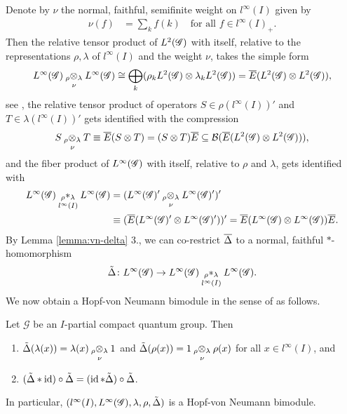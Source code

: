 Denote by $\nu$ the
normal, faithful, semifinite weight on $l^{\infty}(I)$ given by
\begin{align} \label{eq:vn-nu}
  \nu(f) &=\sum_{k} f(k) \quad \text{for all } f\in l^{\infty}(I)_{+}.
\end{align}
Then the relative tensor product of $L^{2}(\mathscr{G})$ with itself,
relative to the representations $\rho,\lambda$ of $l^{\infty}(I)$ and
the weight $\nu$, takes the simple form
\begin{align*}
L^{\infty}(\mathscr{G}) \underset{\nu{}}{_{\rho}\otimes_{\lambda}} L^{\infty}(\mathscr{G}) \cong
  \bigoplus_{k} (\rho_{k}L^{2}(\mathscr{G}) \otimes \lambda_{k}L^{2}(\mathscr{G})) =
  \overline{E}(L^{2}(\mathscr{G}) \otimes L^{2}(\mathscr{G})),
\end{align*}
see \cite{},  the relative tensor product
of operators $S\in \rho(l^{\infty}(I))'$ and $T \in
\lambda(l^{\infty}(I))'$ gets identified with the compression
\begin{align*}
S \underset{\nu{}}{_{\rho}\otimes_{\lambda}} T \equiv
  \overline{E}(S \otimes
  T) = (S \otimes T)\overline{E} \subseteq {\cal B}(\overline{E}(L^{2}(\mathscr{G})
  \otimes L^{2}(\mathscr{G}))),
\end{align*}
and the fiber product of  $  L^{\infty}(\mathscr{G})$ with itself, relative to $\rho$
and $\lambda$,  gets identified with
\begin{align} \label{eq:vn-fiber}
  \begin{aligned}
    L^{\infty}(\mathscr{G}) \underset{l^{\infty}(I)}{_{\rho}\ast_{\lambda}} L^{\infty}(\mathscr{G}) &= (L^{\infty}(\mathscr{G})' \underset{\nu{}}{_{\rho}\otimes_{\lambda}} L^{\infty}(\mathscr{G})')' \\ &\equiv
    (\overline{E}(L^{\infty}(\mathscr{G})' \otimes L^{\infty}(\mathscr{G})'))' = \overline{E}(L^{\infty}(\mathscr{G}) \otimes
    L^{\infty}(\mathscr{G}))\overline{E}.
  \end{aligned}
\end{align} 
By Lemma \ref{lemma:vn-delta} 3., we can co-restrict $\overline{\Delta}$ to  a
normal, faithful $*$-homomorphism
\begin{align*}
  \tilde\Delta \colon L^{\infty}(\mathscr{G}) \to   L^{\infty}(\mathscr{G}) \underset{l^{\infty}(I)}{_{\rho}\ast_{\lambda}} L^{\infty}(\mathscr{G}).
\end{align*}
We now obtain a Hopf-von Neumann bimodule in the
sense of \cite{} as follows.
\begin{Prop}
  Let $\mathscr{G}$ be an $I$-partial compact quantum group. Then
  \begin{enumerate}
  \item $\tilde\Delta(\lambda(x)) = \lambda(x) \underset{\nu{}}{_{\rho}\otimes_{\lambda}} 1$ and
    $\tilde\Delta(\rho(x)) = 1 \underset{\nu{}}{_{\rho}\otimes_{\lambda}} \rho(x)$ for all $x\in
    l^{\infty}(I)$, and
  \item $(\tilde\Delta \ast \operatorname{id})\circ \tilde\Delta = (\operatorname{id} \ast \tilde\Delta)
    \circ \tilde\Delta$.
  \end{enumerate}
  In particular, $(l^{\infty}(I),L^{\infty}(\mathscr{G}), \lambda,\rho,\tilde\Delta)$ is a
  Hopf-von Neumann bimodule.
\end{Prop}
